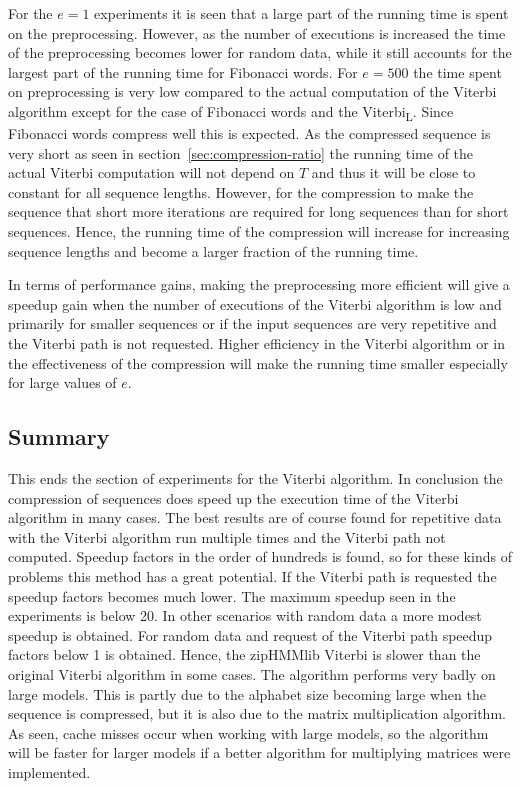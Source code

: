 For the $e = 1$ experiments it is seen that a large part of the running time is
spent on the preprocessing. However, as the number of executions is increased
the time of the preprocessing becomes lower for random data, while it still
accounts for the largest part of the running time for Fibonacci words. For $e = 500$
the time spent on preprocessing is very low compared to the actual computation
of the Viterbi algorithm except for the case of Fibonacci words and the
Viterbi\textsubscript{L}. Since Fibonacci words compress well this is expected.
As the compressed sequence is very short as seen in
section~\ref{sec:compression-ratio} the running time of the actual Viterbi
computation will not depend on $T$ and thus it will be close to constant for
all sequence lengths. However, for the compression to make the sequence that
short more iterations are required for long sequences than for short sequences.
Hence, the running time of the compression will increase for increasing
sequence lengths and become a larger fraction of the running time.

In terms of performance gains, making the preprocessing more efficient will
give a speedup gain when the number of executions of the Viterbi algorithm is
low and primarily for smaller sequences or if the input sequences are very
repetitive and the Viterbi path is not requested. Higher efficiency in the
Viterbi algorithm or in the effectiveness of the compression will make the
running time smaller especially for large values of $e$.

\subsection{Summary}

This ends the section of experiments for the Viterbi algorithm. In
conclusion the compression of sequences does speed up the execution time of the
Viterbi algorithm in many cases. The best results are of course found for
repetitive data with the Viterbi algorithm run multiple times and the Viterbi
path not computed. Speedup factors in the order of hundreds is found, so
for these kinds of problems this method has a great potential. If the Viterbi
path is requested the speedup factors becomes much lower. The maximum speedup
seen in the experiments is below 20. In other scenarios with random data a
more modest speedup is obtained. For random data and request of the Viterbi
path speedup factors below 1 is obtained. Hence, the zipHMMlib Viterbi is slower
than the original Viterbi algorithm in some cases. The algorithm performs very
badly on large models. This is partly due to the alphabet size becoming large
when the sequence is compressed, but it is also due to the matrix
multiplication algorithm. As seen, cache misses occur when working with large
models, so the algorithm will be faster for larger models if a better algorithm
for multiplying matrices were implemented.

